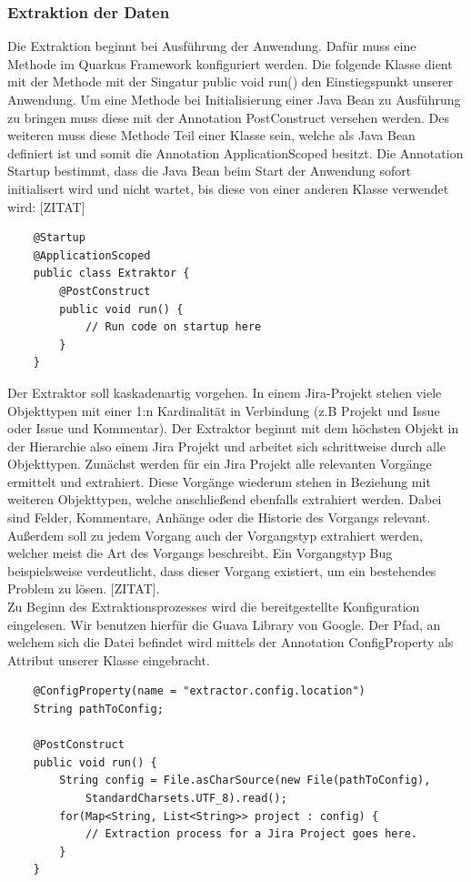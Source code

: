 \documentclass[10pt]{article}
\begin{document}
\subsubsection{Extraktion der Daten}
Die Extraktion beginnt bei Ausführung der Anwendung. Dafür muss eine Methode im Quarkus Framework konfiguriert werden. Die folgende Klasse dient mit der Methode mit der Singatur \glqq public void run()\grqq\: den Einstiegspunkt unserer Anwendung. Um eine Methode bei Initialisierung einer Java Bean zu Ausführung zu bringen muss diese mit der Annotation \glqq PostConstruct\grqq\: versehen werden. Des weiteren muss diese Methode Teil einer Klasse sein, welche als Java Bean definiert ist und somit die Annotation \glqq ApplicationScoped\grqq\: besitzt. Die Annotation \glqq Startup\grqq\: bestimmt, dass die Java Bean beim Start der Anwendung sofort initialisert wird und nicht wartet, bis diese von einer anderen Klasse verwendet wird: [ZITAT]
\begin{verbatim}
    @Startup
    @ApplicationScoped
    public class Extraktor {
        @PostConstruct
        public void run() {
            // Run code on startup here
        }
    }
\end{verbatim}
Der Extraktor soll kaskadenartig vorgehen. In einem Jira-Projekt stehen viele Objekttypen mit einer 1:n Kardinalität in Verbindung (z.B Projekt und Issue oder Issue und Kommentar). Der Extraktor beginnt mit dem höchsten Objekt in der Hierarchie also einem Jira Projekt und arbeitet sich schrittweise durch alle Objekttypen. Zunächst werden für ein Jira Projekt alle relevanten Vorgänge ermittelt und extrahiert. Diese Vorgänge wiederum stehen in Beziehung mit weiteren Objekttypen, welche anschließend ebenfalls extrahiert werden. Dabei sind Felder, Kommentare, Anhänge oder die Historie des Vorgangs relevant. Außerdem soll zu jedem Vorgang auch der Vorgangstyp extrahiert werden, welcher meist die Art des Vorgangs beschreibt. Ein Vorgangstyp Bug beispielsweise verdeutlicht, dass dieser Vorgang existiert, um ein bestehendes Problem zu lösen. [ZITAT].\\
Zu Beginn des Extraktionsprozesses wird die bereitgestellte Konfiguration eingelesen. Wir benutzen hierfür die Guava Library von Google. Der Pfad, an welchem sich die Datei befindet wird mittels der Annotation \glqq ConfigProperty\grqq\: als Attribut unserer Klasse eingebracht.
\begin{verbatim}
    @ConfigProperty(name = "extractor.config.location")
    String pathToConfig;
    
    @PostConstruct
    public void run() {
        String config = File.asCharSource(new File(pathToConfig), 
            StandardCharsets.UTF_8).read();
        for(Map<String, List<String>> project : config) {
            // Extraction process for a Jira Project goes here.
        }
    }
\end{verbatim}
\end{document}
